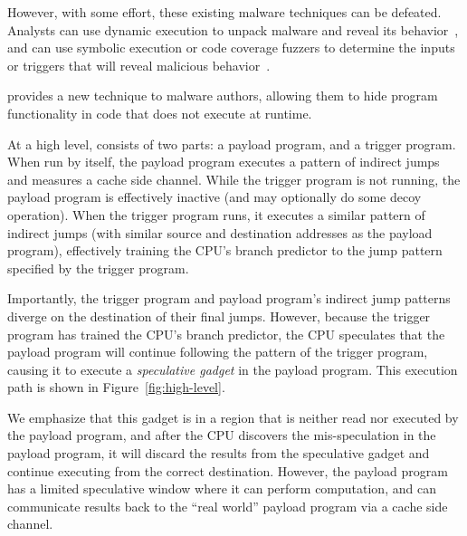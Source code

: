 However, with some effort, these existing malware techniques can be defeated.
Analysts can use
dynamic execution to unpack malware and reveal its
behavior~\cite{balzarotti2010efficient}, and can use symbolic execution or code
coverage fuzzers to determine the inputs or triggers that will reveal malicious
behavior~\cite{moser2007exploring,schwartz2010all,wang2017angr,egele2012survey}.


\speculake provides a new technique to malware authors, allowing them to hide
program functionality in code that does not execute at runtime.


At a high level, \speculake consists of two parts: a payload program, and a
trigger program. When run by itself, the payload program executes a pattern of
indirect jumps and measures a cache side channel. While the trigger program is
not running, the payload program is effectively inactive (and may optionally do
some decoy operation). When the trigger program runs, it executes a similar
pattern of indirect jumps (with similar source and destination addresses as the
payload program), effectively training the CPU's branch predictor to the jump
pattern specified by the trigger program.

Importantly, the trigger program and payload program's indirect jump patterns
diverge on the destination of their final jumps. However, because the trigger
program has trained the CPU's branch predictor, the CPU speculates that the
payload program will continue following the pattern of the trigger program,
causing it to execute a \emph{speculative gadget} in the payload
program. This execution path is shown in Figure~\ref{fig:high-level}.

We emphasize that this gadget is in a region that is neither
read nor executed by the payload program, and after the CPU discovers the
mis-speculation in the payload program, it will discard the results from the
speculative gadget and continue executing from the correct destination. However,
the payload program has a limited speculative window where it can perform
computation, and can communicate results back to the ``real world'' payload 
program via a cache side channel.



\FigHighLevel



